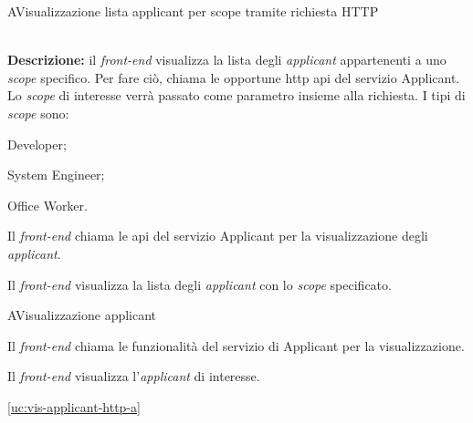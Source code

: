 \begin{usecase}{2.3}{A}{Visualizzazione lista applicant per scope tramite richiesta HTTP}


	\textbf{\\Descrizione:} il \textit{front-end} visualizza la lista degli \textit{applicant} appartenenti a uno \textit{scope} specifico. Per fare ciò, chiama le opportune \acrshort{http} \acrshort{api} del servizio Applicant. Lo \textit{scope} di interesse verrà passato come parametro insieme alla richiesta.
	I tipi di \textit{scope} sono:
	\begin{ucitemize}
		\item Developer;
		\item System Engineer;
		\item Office Worker.
	\end{ucitemize}

	\begin{ucscenarioprincipale}
		\item Il \textit{front-end} chiama le \acrshort{api} del servizio Applicant per la visualizzazione degli \textit{applicant}.
		\item Il \textit{front-end} visualizza la lista degli \textit{applicant} con lo \textit{scope} specificato.
	\end{ucscenarioprincipale}


	\label{uc:vis-lista-applicant-scope-http-a}
\end{usecase}

\begin{usecase}{3}{A}{Visualizzazione applicant}



	\begin{ucscenarioprincipale}
		\item Il \textit{front-end} chiama le funzionalità del servizio di Applicant per la visualizzazione.
		\item Il \textit{front-end} visualizza l'\textit{applicant} di interesse.
	\end{ucscenarioprincipale}


	\begin{ucgeneralizzazioni}
		\item \ref{uc:vis-applicant-http-a}
	\end{ucgeneralizzazioni}

	\label{uc:vis-applicant-a}
\end{usecase}

